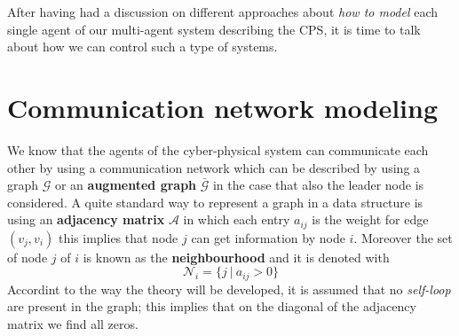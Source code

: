 After having had a discussion on different approaches about \textit{how to model} each single agent of our multi-agent system describing the CPS, it is time to talk about how we can control such a type of systems.

\section{Communication network modeling}
We know that the agents of the cyber-physical system can communicate each other by using a communication network which can be described by using a graph $\mathcal{G}$ or an \textbf{augmented graph} $\bar{\mathcal{G}}$ in the case that also the leader node is considered. A quite standard way to represent a graph in a data structure is using an \textbf{adjacency matrix} $\mathcal{A}$ in which each entry $a_{ij}$ is the weight for edge $(v_j, v_i)$ this implies that node $j$ can get information by node $i$. Moreover the set of node $j$ of $i$ is known as the \textbf{neighbourhood} and it is denoted with
\begin{equation*}
   \mathcal{N}_i = \{j \ | \ a_{ij}>0\}
\end{equation*} 
Accordint to the way the theory will be developed, it is assumed that no \textit{self-loop} are present in the graph; this implies that on the diagonal of the adjacency matrix we find all zeros.

